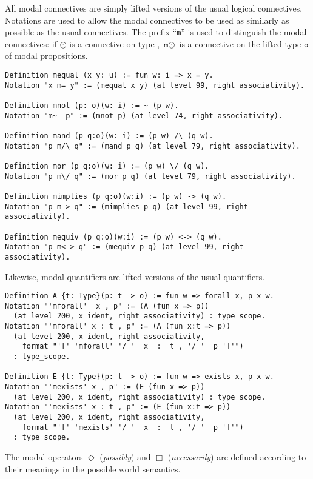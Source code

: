 \documentclass{llncs}
\begin{document}
\noindent
All modal connectives are simply lifted versions of the usual logical connectives. Notations are used to allow the modal connectives to be used as similarly as possible as the usual connectives. The prefix ``\texttt{m}'' is used to distinguish the modal connectives: if $\odot$ is a connective on type , $\texttt{m}\odot$ is a connective on the lifted type $\texttt{o}$ of modal propositions.  

\begin{verbatim}
Definition mequal (x y: u) := fun w: i => x = y.
Notation "x m= y" := (mequal x y) (at level 99, right associativity).

Definition mnot (p: o)(w: i) := ~ (p w).
Notation "m~  p" := (mnot p) (at level 74, right associativity).

Definition mand (p q:o)(w: i) := (p w) /\ (q w).
Notation "p m/\ q" := (mand p q) (at level 79, right associativity).

Definition mor (p q:o)(w: i) := (p w) \/ (q w).
Notation "p m\/ q" := (mor p q) (at level 79, right associativity).

Definition mimplies (p q:o)(w:i) := (p w) -> (q w).
Notation "p m-> q" := (mimplies p q) (at level 99, right associativity).

Definition mequiv (p q:o)(w:i) := (p w) <-> (q w).
Notation "p m<-> q" := (mequiv p q) (at level 99, right associativity).
\end{verbatim}

\noindent
Likewise, modal quantifiers are lifted versions of the usual quantifiers.

\begin{verbatim}
Definition A {t: Type}(p: t -> o) := fun w => forall x, p x w.
Notation "'mforall'  x , p" := (A (fun x => p))
  (at level 200, x ident, right associativity) : type_scope.
Notation "'mforall' x : t , p" := (A (fun x:t => p))
  (at level 200, x ident, right associativity, 
    format "'[' 'mforall' '/ '  x  :  t , '/ '  p ']'")
  : type_scope.

Definition E {t: Type}(p: t -> o) := fun w => exists x, p x w.
Notation "'mexists' x , p" := (E (fun x => p))
  (at level 200, x ident, right associativity) : type_scope.
Notation "'mexists' x : t , p" := (E (fun x:t => p))
  (at level 200, x ident, right associativity, 
    format "'[' 'mexists' '/ '  x  :  t , '/ '  p ']'")
  : type_scope.
\end{verbatim}

\noindent
The modal operators $\Diamond$ (\emph{possibly}) and $\Box$ (\emph{necessarily}) are defined according to their meanings in the possible world semantics.
\end{document}
